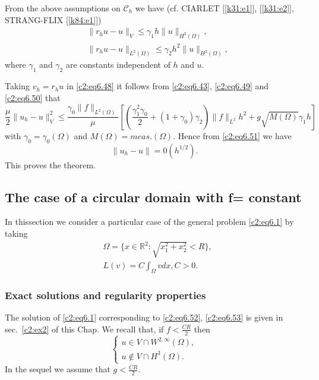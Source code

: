 From the above assumptions on $\mathscr{C}_h$ we have (cf. CIARLET
[\ref{k31:e1}], [\ref{k31:e2}], STRANG-FLIX [\ref{k84:e1}]) 
\begin{align}
& \parallel  r_h u-u \parallel_V \leq \gamma_1 h \parallel u \parallel_{H^2
    (\Omega)},\tag{6.49}\label{c2:eq6.49}\\ 
& \parallel  r_h u-u \parallel_{L^2 (\Omega )} \leq \gamma_2 h^2 \parallel u \parallel_{H^2
    (\Omega)},\tag{6.50}\label{c2:eq6.50} 
\end{align}
where $\gamma_1$ and $\gamma_2$ are constants independent of $h$ and
$u$.  

Taking $v_h = r_h u$ in \eqref{c2:eq6.48} it follows from \eqref{c2:eq6.43},
\eqref{c2:eq6.49} and \eqref{c2:eq6.50} that  
{\fontsize{10}{12}\selectfont
\begin{equation}
\frac{\mu}{2} \parallel  u_h - u \parallel^2_V \leq \frac{\gamma_0 \parallel  f \parallel_{L^2
    (\Omega)}}{\mu} [ (\frac{\gamma^2_1 \gamma_0}{2} + (1 + \gamma_0)
  \gamma_2)\parallel  f\parallel_{L^2} h^2 + g \sqrt{M (\Omega)} \gamma_1 h]
\tag{6.51} \label{c2:eq6.51}
\end{equation}}\relax
with $\gamma_0 = \gamma_0 (\Omega)$ and $M (\Omega)=
meas. (\Omega)$. Hence from \eqref{c2:eq6.51} we have  
$$
\parallel u_h - u \parallel  = 0 (h^{1/2}).
$$
This proves the theorem.

\subsection{The case of a circular domain with f=
  constant}\label{c2:ss6.8}  
In this\pageoriginale  section we consider a particular case of the general problem 
\eqref{c2:eq6.1} by taking 
\begin{align}
& \Omega = \{ x \in \mathbb{R}^2 : \sqrt{x^2_1 + x^2_2} < R \},
  \tag{6.52}\label{c2:eq6.52}\\ 
& L(v) = C \int_\Omega v dx, C>0. \tag{6.53}\label{c2:eq6.53}
\end{align}
\subsubsection{Exact solutions and regularity properties}\label{c2:sss6.8.1} 
The solution of \eqref{c2:eq6.1} corresponding to \eqref{c2:eq6.52}, 
\eqref{c2:eq6.53} is given in sec.~\ref{c2:ex2} of this Chap. We
recall that, if $f < \frac{CR}{2}$ then   
\begin{equation}
\begin{cases}
u \in V \cap W^{2, \infty}(\Omega),\\
u \notin V \cap H^3 (\Omega).
\end{cases}
\tag{6.54}\label{c2:eq6.54}
\end{equation}
In the sequel we assume that $g < \frac{CR}{2}$.

